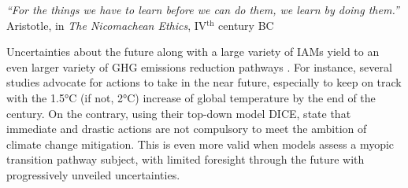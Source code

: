 \vspace{-0.2cm}
\begin{flushright}
\emph{``For the things we have to learn before we can do them, we learn by doing them.''}\\
Aristotle, in \textit{The Nicomachean Ethics}, IV$^\text{th}$ century BC
\end{flushright}
\vspace{0.4cm}

Uncertainties about the future along with a large variety of \gls{IAMs} yield to an even larger variety of \gls{GHG} emissions reduction pathways \cite{nicolas2021robust}. For instance, several studies \cite{IPCC_CO2_budget,steffen2018trajectories} advocate for actions to take in the near future, especially to keep on track with the 1.5°C (if not, 2°C) increase of global temperature by the end of the century. On the contrary, using their top-down model DICE, \citet{nordhaus2014question} state that immediate and drastic actions are not compulsory to meet the ambition of climate change mitigation.  This is even more valid when models assess a myopic transition pathway subject, with limited foresight through the future with progressively unveiled uncertainties. 

